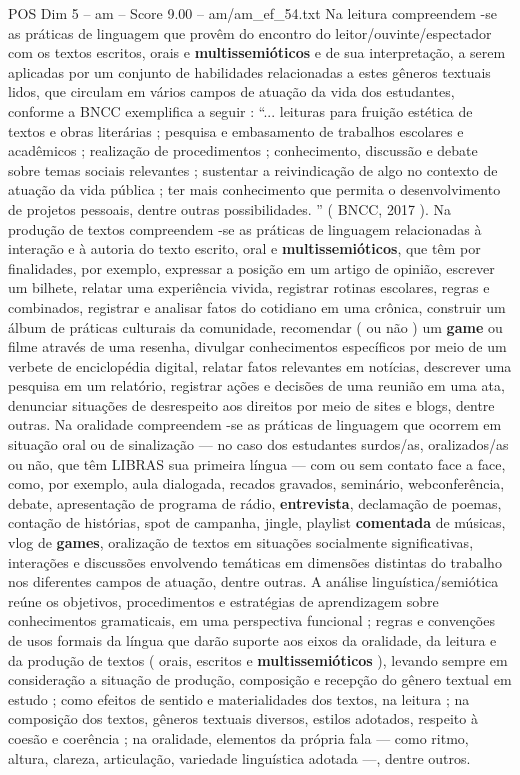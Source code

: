 \begin{textsample}{POS Dim 5 – am – Score 9.00 – am/am\_ef\_54.txt}
Na leitura compreendem -se as práticas de linguagem que provêm do encontro do leitor/ouvinte/espectador com os textos escritos, orais e \textbf{multissemióticos} e de sua interpretação, a serem aplicadas por um conjunto de habilidades relacionadas a estes gêneros textuais lidos, que circulam em vários campos de atuação da vida dos estudantes, conforme a BNCC exemplifica a seguir : “... leituras para fruição estética de textos e obras literárias ; pesquisa e embasamento de trabalhos escolares e acadêmicos ; realização de procedimentos ; conhecimento, discussão e debate sobre temas sociais relevantes ; sustentar a reivindicação de algo no contexto de atuação da vida pública ; ter mais conhecimento que permita o desenvolvimento de projetos pessoais, dentre outras possibilidades. ” ( BNCC, 2017 ).
Na produção de textos compreendem -se as práticas de linguagem relacionadas à interação e à autoria do texto escrito, oral e \textbf{multissemióticos}, que têm por finalidades, por exemplo, expressar a posição em um artigo de opinião, escrever um bilhete, relatar uma experiência vivida, registrar rotinas escolares, regras e combinados, registrar e analisar fatos do cotidiano em uma crônica, construir um álbum de práticas culturais da comunidade, recomendar ( ou não ) um \textbf{game} ou filme através de uma resenha, divulgar conhecimentos específicos por meio de um verbete de enciclopédia digital, relatar fatos relevantes em notícias, descrever uma pesquisa em um relatório, registrar ações e decisões de uma reunião em uma ata, denunciar situações de desrespeito aos direitos por meio de sites e blogs, dentre outras.
Na oralidade compreendem -se as práticas de linguagem que ocorrem em situação oral ou de sinalização — no caso dos estudantes surdos/as, oralizados/as ou não, que têm LIBRAS sua primeira língua — com ou sem contato face a face, como, por exemplo, aula dialogada, recados gravados, seminário, webconferência, debate, apresentação de programa de rádio, \textbf{entrevista}, declamação de poemas, contação de histórias, spot de campanha, jingle, playlist \textbf{comentada} de músicas, vlog de \textbf{games}, oralização de textos em situações socialmente significativas, interações e discussões envolvendo temáticas em dimensões distintas do trabalho nos diferentes campos de atuação, dentre outras.
A análise linguística/semiótica reúne os objetivos, procedimentos e estratégias de aprendizagem sobre conhecimentos gramaticais, em uma perspectiva funcional ; regras e convenções de usos formais da língua que darão suporte aos eixos da oralidade, da leitura e da produção de textos ( orais, escritos e \textbf{multissemióticos} ), levando sempre em consideração a situação de produção, composição e recepção do gênero textual em estudo ; como efeitos de sentido e materialidades dos textos, na leitura ; na composição dos textos, gêneros textuais diversos, estilos adotados, respeito à coesão e coerência ; na oralidade, elementos da própria fala — como ritmo, altura, clareza, articulação, variedade linguística adotada —, dentre outros.

\end{textsample}
